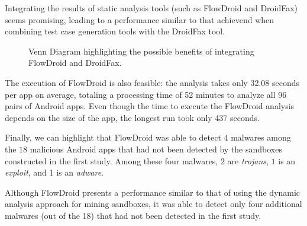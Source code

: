 \begin{finding}
  Integrating the results of static analysis tools
  (such as FlowDroid and DroidFax) seems promising,
  leading to a performance similar to that achievend
  when combining test case generation tools with the
  DroidFax tool. 
\end{finding}

\begin{figure}
  \caption{Venn Diagram highlighting the possible benefits of
    integrating FlowDroid and DroidFax.}
  \label{fig:venn-plot2}

\end{figure}

The execution of FlowDroid is also feasible: the analysis takes only
32.08 seconds per app on average, totaling a processing time of 52
minutes to analyze all 96 pairs of Android apps.
Even though the time to execute the FlowDroid analysis depends on the size
of the app, the longest run took only 437 seconds. 

Finally, we can highlight that FlowDroid was able to detect $4$ malwares among the $18$ malicious Android apps that had not
been detected by the sandboxes constructed in the first study. Among these
four malwares, $2$ are \emph{trojans}, $1$ is an \emph{exploit}, and 1 is an \emph{adware}.

\begin{finding}
  Although FlowDroid presents a performance similar
  to that of using the dynamic analysis approach for mining sandboxes,
  it was able to detect only four additional malwares (out of the
  18) that had not been detected in the first study. 
\end{finding}

